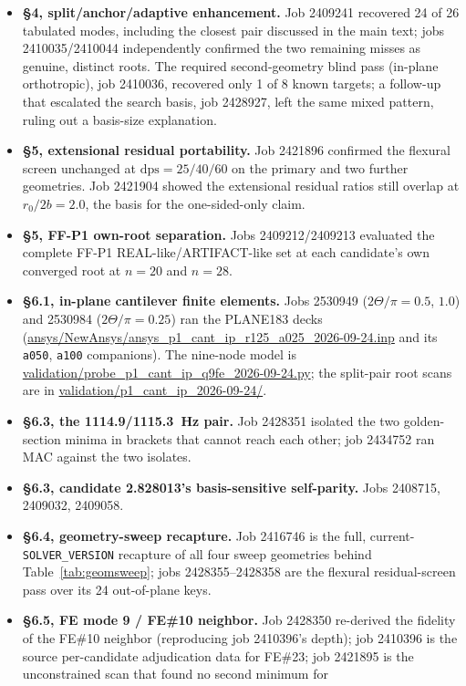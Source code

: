 \documentclass[11pt]{article}
\begin{document}
\begin{itemize}\itemsep2pt
\item \textbf{\S4, split/anchor/adaptive enhancement.} Job 2409241
recovered 24 of 26 tabulated modes, including the closest pair discussed
in the main text; jobs 2410035/2410044 independently confirmed the two
remaining misses as genuine, distinct roots. The required second-geometry
blind pass (in-plane orthotropic), job 2410036, recovered only 1 of 8
known targets; a follow-up that escalated the search basis, job 2428927,
left the same mixed pattern, ruling out a basis-size explanation.
\item \textbf{\S5, extensional residual portability.} Job 2421896
confirmed the flexural screen unchanged at $\mathrm{dps}=25/40/60$ on the
primary and two further geometries. Job 2421904 showed the extensional
residual ratios still overlap at $r_0/2b=2.0$, the basis for the
one-sided-only claim.
\item \textbf{\S5, FF-P1 own-root separation.} Jobs 2409212/2409213
evaluated the complete FF-P1 REAL-like/ARTIFACT-like set at each
candidate's own converged root at $n=20$ and $n=28$.
\item \textbf{\S6.1, in-plane cantilever finite elements.} Jobs 2530949
($2\Theta/\pi=0.5$, $1.0$) and 2530984 ($2\Theta/\pi=0.25$) ran the
PLANE183 decks
(\url{ansys/NewAnsys/ansys_p1_cant_ip_r125_a025_2026-09-24.inp} and its
\texttt{a050}, \texttt{a100} companions). The nine-node model is
\url{validation/probe_p1_cant_ip_q9fe_2026-09-24.py}; the split-pair root
scans are in \url{validation/p1_cant_ip_2026-09-24/}.
\item \textbf{\S6.3, the 1114.9/1115.3~Hz pair.} Job 2428351 isolated the
two golden-section minima in brackets that cannot reach each other; job
2434752 ran MAC against the two isolates.
\item \textbf{\S6.3, candidate 2.828013's basis-sensitive self-parity.}
Jobs 2408715, 2409032, 2409058.
\item \textbf{\S6.4, geometry-sweep recapture.} Job 2416746 is the full,
current-\texttt{SOLVER\_VERSION} recapture of all four sweep geometries
behind Table~\ref{tab:geomsweep}; jobs 2428355--2428358 are the flexural
residual-screen pass over its 24 out-of-plane keys.
\item \textbf{\S6.5, FE mode 9 / FE\#10 neighbor.} Job 2428350 re-derived
the fidelity of the FE\#10 neighbor (reproducing job 2410396's depth);
job 2410396 is the source per-candidate adjudication data for FE\#23; job
2421895 is the unconstrained scan that found no second minimum for

\end{itemize}
\end{document}

